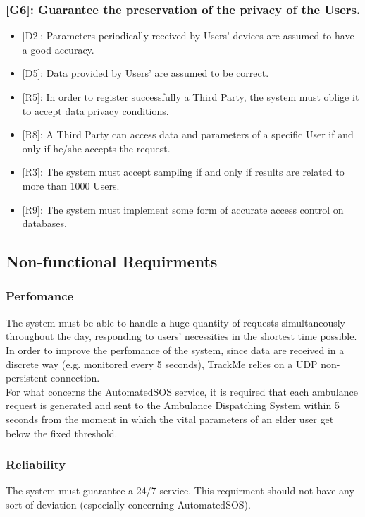 \documentclass[12pt,a4paper]{article}
\begin{document}
	\subsubsection*{{[}{G6}{]}: Guarantee the preservation of the privacy of the Users.}
	\begin{itemize}
		\begin{itemize}
			\item {[D2]}: Parameters periodically received by Users' devices are assumed to have a good accuracy. 
			\item {[D5]}: Data provided by Users' are assumed to be correct. 
			\item {[R5]}: In order to register successfully a Third Party, the system must oblige it to accept data privacy conditions.
			\item {[R8]}: A Third Party can access data and parameters of a specific User if and only if he/she accepts the request.
			\item {[R3]}: The system must accept sampling if and only if results are related to more than 1000 Users.
			\item {[R9]}: The system must implement some form of accurate access control on databases.
		\end{itemize}
	\end{itemize}
	
	\subsection{Non-functional Requirments}
	\subsubsection{Perfomance}
	The system must be able to handle a huge quantity of requests simultaneously throughout the day, responding to users' necessities in the shortest time possible. In order to improve the perfomance of the system, since data are received in a discrete way (e.g. monitored every 5 seconds), TrackMe relies on a UDP non-persistent connection.\\
	For what concerns the AutomatedSOS service, it is required that each ambulance request is generated and sent to the Ambulance Dispatching System within 5 seconds from the moment in which the vital parameters of an elder user get below the fixed threshold.
	\subsubsection{Reliability}
	The system must guarantee a 24/7 service. This requirment should not have any sort of deviation (especially concerning AutomatedSOS).
\end{document}

